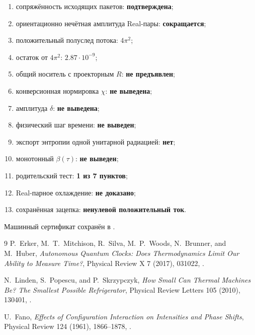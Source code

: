 \begin{protocol}
\begin{enumerate}
 \item сопряжённость исходящих пакетов: \textbf{подтверждена};
 \item ориентационно нечётная амплитуда Real-пары: \textbf{сокращается};
 \item положительный полуслед потока: \textbf{$4\pi^2$};
 \item остаток от $4\pi^2$: \textbf{$2.87\cdot10^{-9}$};
 \item общий носитель с проекторным $R$: \textbf{не предъявлен};
 \item конверсионная нормировка $\chi$: \textbf{не выведена};
 \item амплитуда $\delta$: \textbf{не выведена};
 \item физический шаг времени: \textbf{не выведен};
 \item экспорт энтропии одной унитарной радиацией: \textbf{нет};
 \item монотонный $\beta(\tau)$: \textbf{не выведен};
 \item родительский тест: \textbf{1 из 7 пунктов};
 \item Real-парное охлаждение: \textbf{не доказано};
 \item сохранённая зацепка: \textbf{ненулевой положительный ток}.
\end{enumerate}
\end{protocol}

Машинный сертификат сохранён в
.

\begin{thebibliography}{9}
P.~Erker, M.~T.~Mitchison, R.~Silva, M.~P.~Woods, N.~Brunner, and
M.~Huber, \emph{Autonomous Quantum Clocks: Does Thermodynamics Limit Our
Ability to Measure Time?}, Physical Review X 7 (2017), 031022,
.

N.~Linden, S.~Popescu, and P.~Skrzypczyk,
\emph{How Small Can Thermal Machines Be? The Smallest Possible
Refrigerator}, Physical Review Letters 105 (2010), 130401,
.

U.~Fano,
\emph{Effects of Configuration Interaction on Intensities and Phase Shifts},
Physical Review 124 (1961), 1866--1878,
.
\end{thebibliography}